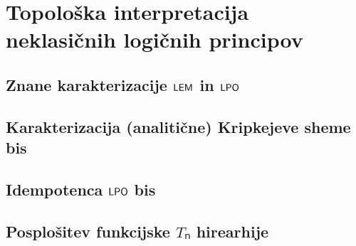 \section{Topološka interpretacija neklasičnih logičnih principov}

\subsection{Znane karakterizacije \(\textnormal{\sffamily LEM}\) in \(\textnormal{\sffamily LPO}\)}
\subsection{Karakterizacija (analitične) Kripkejeve sheme bis}
\subsection{Idempotenca \(\textnormal{\sffamily LPO}\) bis}
\subsection{Posplošitev funkcijske \(Tₙ\) hirearhije}


